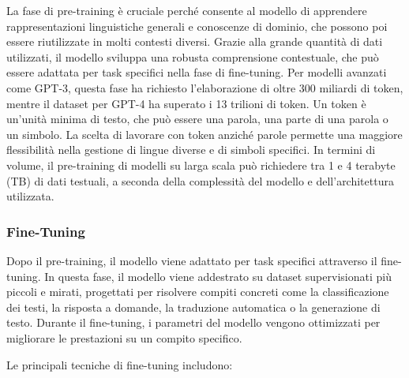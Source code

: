 \documentclass[target=mst,aauheader=,style=]{thud}
\begin{document}
La fase di pre-training è cruciale perché consente al modello di apprendere rappresentazioni linguistiche generali e conoscenze di dominio, che possono poi essere riutilizzate in molti contesti diversi. Grazie alla grande quantità di dati utilizzati, il modello sviluppa una robusta comprensione contestuale, che può essere adattata per task specifici nella fase di fine-tuning. Per modelli avanzati come GPT-3, questa fase ha richiesto l'elaborazione di oltre 300 miliardi di token, mentre il dataset per GPT-4 ha superato i 13 trilioni di token. Un token è un'unità minima di testo, che può essere una parola, una parte di una parola o un simbolo. La scelta di lavorare con token anziché parole permette una maggiore flessibilità nella gestione di lingue diverse e di simboli specifici. In termini di volume, il pre-training di modelli su larga scala può richiedere tra 1 e 4 terabyte (TB) di dati testuali, a seconda della complessità del modello e dell'architettura utilizzata.

\subsubsection{Fine-Tuning}
Dopo il pre-training, il modello viene adattato per task specifici attraverso il fine-tuning. In questa fase, il modello viene addestrato su dataset supervisionati più piccoli e mirati, progettati per risolvere compiti concreti come la classificazione dei testi, la risposta a domande, la traduzione automatica o la generazione di testo. Durante il fine-tuning, i parametri del modello vengono ottimizzati per migliorare le prestazioni su un compito specifico.

Le principali tecniche di fine-tuning includono\cite{hadi_2024}:
\end{document}
